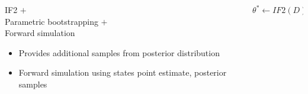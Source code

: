 \documentclass[12pt]{beamer}
\begin{document}
\begin{frame}

	\begin{columns}
		\begin{column}{0.65\textwidth}

			\large
			IF2 $+$ \\
			Parametric bootstrapping $+$ \\
			Forward simulation
			\vspace{\baselineskip}
			\footnotesize

			\begin{itemize}
				\item Provides additional samples from posterior distribution
				\item Forward simulation using states point estimate, posterior samples
			\end{itemize}
			
			
		\end{column}
		\begin{column}{0.35\textwidth}

			\tiny
			\begin{algorithm}[H]

		        \BlankLine

		        \DontPrintSemicolon


		        \BlankLine

		        $\theta^* \gets IF2(D)$

		        \BlankLine


		        \BlankLine



		        \BlankLine



		    \end{algorithm}

		\end{column}
	\end{columns}

\end{frame}
\end{document}
